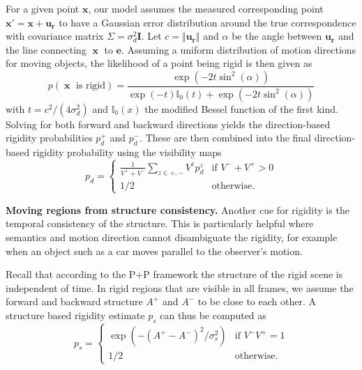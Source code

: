 \documentclass[10pt,twocolumn,letterpaper]{article}
\DeclareMathOperator{\x}{\mathbf{x}}
\begin{document}
For a given point $\mathbf{x}$, our model assumes the measured corresponding point $\mathbf{x}' = \mathbf{x} + \mathbf{u_r}$ to have a Gaussian error distribution around the true correspondence with covariance matrix $\Sigma = \sigma_d^2 \mathbf{I}$.
Let $c=\Vert \mathbf{u_r} \Vert$ and $\alpha$ be the angle between $\mathbf{u_r}$ and the line connecting $\x$ to $\mathbf{e}$.
Assuming a uniform distribution of motion directions for moving objects, the likelihood of a point being rigid is then given as
\begin{equation}
p\left(\x \text{ is rigid}\right)
=
\frac{ \exp \left( - 2 t \sin^2(\alpha) \right) }
{
\exp\left( -t \right) 
	\mathbb{I}_0 \left(t\right)
+ \exp \left( - 2 t \sin^2(\alpha) \right)
}
\end{equation}
with $t = c^2 / (4 \sigma_d^2 )$ and
$\mathbb{I}_0(x)$ the modified Bessel function of the first kind.
Solving for both forward and backward directions yields the direction-based rigidity probabilities $p_{d}^+$ and $p_{d}^-$.
These are then combined into the final direction-based rigidity probability using the visibility maps
\begin{equation}
p_d =
\begin{cases}
\frac{1}{V^+ + V^-} \sum_{z\in{+,-}} V^z p_d^z
 &\text{if } V^- + V^+ > 0 \\
1/2 &\text{otherwise.}
\end{cases}
\end{equation}





\noindent
{\bf Moving regions from structure consistency.}
Another cue for rigidity is the temporal consistency of the structure.
This is particularly helpful where semantics and motion direction cannot disambiguate the rigidity, for example when an object such as a car moves parallel to the observer's motion. 

Recall that according to the P+P framework the structure of the rigid scene is independent of time.
In rigid regions that are visible in all frames, we assume the forward and backward structure $A^+$ and $A^-$ to be close to each other.
A structure based rigidity estimate $p_s$ can thus be computed as
\begin{equation}
p_{s} =
\begin{cases}
\exp \left( - \left( A^+ - A^- \right)^2 / \sigma_s^2 \right) &\text{if } V^- V^+ = 1 \\
1/2 &\text{otherwise.}
\end{cases}
\end{equation}
\end{document}
